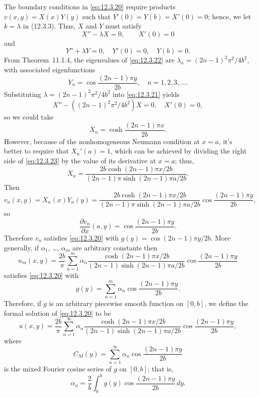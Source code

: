 \begin{examplesolution}
\solution The boundary conditions in \eqref{eq:12.3.20} require products $v(x,y)=X(x)Y(y)$ such that
$Y'(0)=Y(b)=X'(0)=0$; hence, we let $k=\lambda$ in \textup{(12.3.3)}. Thus, $X$ and $Y$ must satisfy
\begin{equation}
  \label{eq:12.3.21}X''-\lambda X=0,\quad\quad X'(0)=0
\end{equation}
and
\begin{equation}
  \label{eq:12.3.22}Y''+\lambda Y=0,\quad Y'(0)=0,\quad Y(b)=0.
\end{equation}
From Theorem~11.1.4, the eigenvalues of \eqref{eq:12.3.22} are
$\lambda_{n}=(2n-1)^{2}\pi^{2}/4b^{2}$, with associated eigenfunctions
\[
  Y_{n}=\cos\frac{(2n-1)\pi y}{2b},\quad n=1,2,3,\dots.
\]
Substituting $\lambda=(2n-1)^{2}\pi^{2}/4b^{2}$ into \eqref{eq:12.3.21} yields
\[
  X''-((2n-1)^{2}\pi^{2}/4b^{2})X=0,\quad X'(0)=0,
\]
so we could take
\begin{equation}
  \label{eq:12.3.23}X_{n}=\cosh\frac{(2n-1)\pi x}{2b}.
\end{equation}
However, because of the nonhomogeneous Neumann condition at $x=a$, it's better to require that
$X_{n}'(a)=1$, which can be achieved by dividing the right side of \eqref{eq:12.3.23} by the value
of its derivative at $x=a$; thus,
\[
  X_{n}= \frac{2b\cosh(2n-1)\pi x/2b}{(2n-1)\pi\sinh(2n-1)\pi a/2b}.
\]
Then
\[
  v_{n}(x,y)=X_{n}(x)Y_{n}(y)= \frac{2b\cosh(2n-1)\pi x/2b}{(2n-1)\pi\sinh(2n-1)\pi a/2b}\cos\frac{(2n-1)\pi y}{2b},
\]
so
\[
  \frac{\partial v_{n}}{\partial x}(a,y)=\cos\frac{(2n-1)\pi y}{2b}.
\]
Therefore $v_{n}$ satisfies \eqref{eq:12.3.20} with $g(y)=\cos(2n-1)\pi y/2b$. More generally, if
$\alpha_{1}$, \dots, $\alpha_{m}$ are arbitrary constants then
\[
  u_{m}(x,y)=\frac{2b}{\pi}\sum_{n=1}^{m}\alpha_{n}\frac{\cosh(2n-1)\pi x/2b}{(2n-1)\sinh(2n-1)\pi a/2b}\cos\frac{(2n-1)\pi y}{2b}
\]
satisfies \eqref{eq:12.3.20} with
\[
  g(y)=\sum_{n=1}^{m}\alpha_{n}\cos\frac{(2n-1)\pi y}{2b}.
\]
Therefore, if $g$ is an arbitrary piecewise smooth function on $[0,b]$, we define the formal
solution of \eqref{eq:12.3.20} to be
\[
  u(x,y)=\frac{2b}{\pi}\sum_{n=1}^{\infty}\alpha_{n}\frac{\cosh(2n-1)\pi x/2b}{(2n-1)\sinh(2n-1)\pi a/2b}\cos\frac{(2n-1)\pi y}{2b},
\]
where
\[
  C_{M}(y)=\sum_{n=1}^{\infty}\alpha_{n}\cos\frac{(2n-1)\pi y}{2b}
\]
is the mixed Fourier cosine series of $g$ on $[0,b]$; that is,
\[
  \alpha_{n}=\frac{2}{b}\int_{0}^{b}g(y)\cos\frac{(2n-1)\pi y}{2b}\,dy.
\]
\end{examplesolution}

